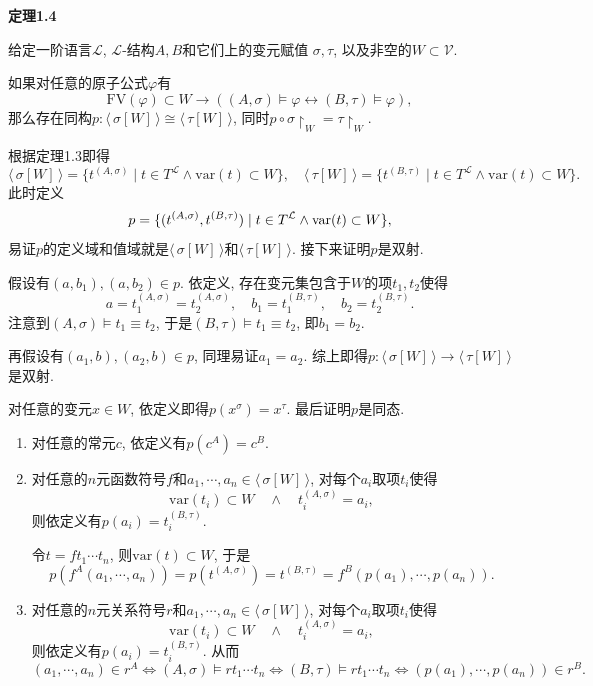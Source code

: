\documentclass[UTF8]{ctexart}
\begin{document}
\newpage

\hypertarget{sec:定理1.4}{}
\noindent\textbf{定理1.4}

给定一阶语言$\mathcal{L}$, $\mathcal{L}$-结构$A,B$和它们上的变元赋值
$\sigma,\tau$, 以及非空的$W\subset\mathcal{V}$.

如果对任意的原子公式$\varphi$有
\[
    \mathrm{FV}(\varphi)\subset W\to
    ((A,\sigma)\models\varphi\leftrightarrow(B,\tau)\models\varphi),
\]
那么存在同构$p:\langle\,\sigma[W]\,\rangle\cong\langle\,\tau[W]\,\rangle$,
同时$p\circ\sigma\!\restriction_W=\tau\!\restriction_W$.


根据定理1.3即得
\[
    \langle\,\sigma[W]\,\rangle=\{t^{(A,\sigma)}\mid
    t\in T^{\mathcal{L}}\land\mathrm{var}(t)\subset W\},\quad
    \langle\,\tau[W]\,\rangle=\{t^{(B,\tau)}\mid
    t\in T^{\mathcal{L}}\land\mathrm{var}(t)\subset W\}.
\]
此时定义
\vspace{-3pt}
\[
    p=\{(t^{(A,\sigma)},t^{(B,\tau)})\mid
    t\in T^{\mathcal{L}}\land\mathrm{var}(t)\subset W\},\\[-3pt]
\]
易证$p$的定义域和值域就是$\langle\,\sigma[W]\,\rangle$和$\langle\,\tau[W]\,\rangle$.
接下来证明$p$是双射.

假设有$(a,b_1),(a,b_2)\in p$. 依定义, 存在变元集包含于$W$的项$t_1,t_2$使得
\[
    a=t_1^{(A,\sigma)}=t_2^{(A,\sigma)},\quad
    b_1=t_1^{(B,\tau)},\quad b_2=t_2^{(B,\tau)}.
\]
注意到$(A,\sigma)\models t_1\equiv t_2$,
于是$(B,\tau)\models t_1\equiv t_2$, 即$b_1=b_2$.

再假设有$(a_1,b),(a_2,b)\in p$, 同理易证$a_1=a_2$.
综上即得$p:\langle\,\sigma[W]\,\rangle\to\langle\,\tau[W]\,\rangle$是双射.

对任意的变元$x\in W$, 依定义即得$p(x^\sigma)=x^{\tau}$. 最后证明$p$是同态.

\begin{enumerate}
    \item 对任意的常元$c$, 依定义有$p(c^A)=c^B$.
    
    \item 对任意的$n$元函数符号$f$和$a_1,\cdots,a_n\in\langle\,\sigma[W]\,\rangle$,
    对每个$a_i$取项$t_i$使得
    \[
        \mathrm{var}(t_i)\subset W\quad\land\quad t_i^{(A,\sigma)}=a_i,
    \]
    则依定义有$p(a_i)=t_i^{(B,\tau)}$.

    \hspace{2.17em}
    令$t=ft_1\cdots t_n$, 则$\mathrm{var}(t)\subset W$, 于是
    \[
        p(f^A(a_1,\cdots,a_n))=p(t^{(A,\sigma)})
        =t^{(B,\tau)}=f^B(p(a_1),\cdots,p(a_n)).
    \]

    \item 对任意的$n$元关系符号$r$和$a_1,\cdots,a_n\in\langle\,\sigma[W]\,\rangle$,
    对每个$a_i$取项$t_i$使得
    \[
        \mathrm{var}(t_i)\subset W\quad\land\quad t_i^{(A,\sigma)}=a_i,
    \]
    则依定义有$p(a_i)=t_i^{(B,\tau)}$. 从而
    \begin{equation*}
        (a_1,\cdots,a_n)\in r^A\iff(A,\sigma)\models rt_1\cdots t_n\iff
        (B,\tau)\models rt_1\cdots t_n\iff(p(a_1),\cdots,p(a_n))\in r^B.
    \tag*{\qedsymbol}\end{equation*}
\end{enumerate}
\end{document}
